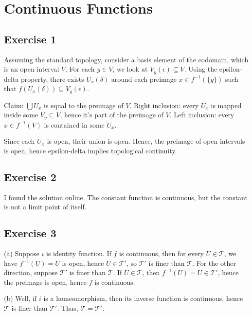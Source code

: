 \documentclass{book}
\begin{document}
\section{Continuous Functions}

\subsection*{Exercise 1}
Assuming the standard topology, consider a basis element of the codomain, which is an open interval $V$. For each $y \in V$, we look at $V_y(\epsilon) \subseteq V$. Using the epsilon-delta property, there exists $U_x(\delta)$ around each preimage $x \in f^{-1}(\{ y \})$ such that $f(U_x(\delta)) \subseteq V_y(\epsilon)$.

Claim: $\bigcup U_x$ is equal to the preimage of $V$. Right inclusion: every $U_x$ is mapped inside some $V_y \subseteq V$, hence it's part of the preimage of $V$. Left inclusion: every $x \in f^{-1}(V)$ is contained in some $U_x$.

Since each $U_x$ is open, their union is open. Hence, the preimage of open intervals is open, hence epsilon-delta implies topological continuity.

\subsection*{Exercise 2}
I found the solution online. The constant function is continuous, but the constant is not a limit point of itself.

\subsection*{Exercise 3}
(a)
Suppose $i$ is identity function. If $f$ is continuous, then for every $U \in \mathcal{T}$, we have $f^{-1}(U) = U$ is open, hence $U \in \mathcal{T}'$, so $\mathcal{T}'$ is finer than $\mathcal{T}$. For the other direction, suppose $\mathcal{T}'$ is finer than $\mathcal{T}$. If $U \in \mathcal{T}$, then $f^{-1}(U) = U \in \mathcal{T}'$, hence the preimage is open, hence $f$ is continuous.

\noindent
(b)
Well, if $i$ is a homeomorphism, then its inverse function is continuous, hence $\mathcal{T}$ is finer than $\mathcal{T}'$. Thus, $\mathcal{T} = \mathcal{T}'$.
\end{document}
